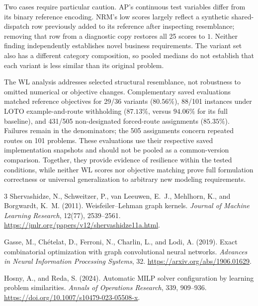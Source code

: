 \documentclass[10pt]{article}
\begin{document}
Two cases require particular caution. AP's continuous test variables
differ from its binary reference encoding. NRM's low scores largely
reflect a synthetic shared-dispatch row previously added to its reference
after inspecting resemblance; removing that row from a diagnostic copy
restores all 25 scores to $1$. Neither finding independently establishes
novel business requirements. The variant set also has a different
category composition, so pooled medians do not establish that each
variant is less similar than its original problem.

The WL analysis addresses selected structural resemblance, not robustness
to omitted numerical or objective changes. Complementary saved evaluations
matched reference objectives for 29/36 variants ($80.56\%$), 88/101
instances under LOTO example-and-route withholding ($87.13\%$, versus
$94.06\%$ for its full baseline), and 431/505 non-designated forced-route
assignments ($85.35\%$). Failures remain in the denominators; the 505
assignments concern repeated routes on 101 problems. These evaluations
use their respective saved implementation snapshots and should not be
pooled as a common-version comparison. Together, they provide evidence
of resilience within the tested conditions, while neither WL scores nor
objective matching prove full formulation correctness or universal
generalization to arbitrary new modeling requirements.
\endgroup

\begin{thebibliography}{3}
Shervashidze, N., Schweitzer, P., van Leeuwen, E.~J., Mehlhorn, K.,
and Borgwardt, K.~M. (2011).
Weisfeiler--Lehman graph kernels.
\emph{Journal of Machine Learning Research}, 12(77), 2539--2561.
\url{https://jmlr.org/papers/v12/shervashidze11a.html}.

Gasse, M., Ch\'{e}telat, D., Ferroni, N., Charlin, L., and Lodi, A. (2019).
Exact combinatorial optimization with graph convolutional neural networks.
\emph{Advances in Neural Information Processing Systems}, 32.
\url{https://arxiv.org/abs/1906.01629}.

Hosny, A., and Reda, S. (2024).
Automatic MILP solver configuration by learning problem similarities.
\emph{Annals of Operations Research}, 339, 909--936.
\url{https://doi.org/10.1007/s10479-023-05508-x}.

\end{thebibliography}
\end{document}
